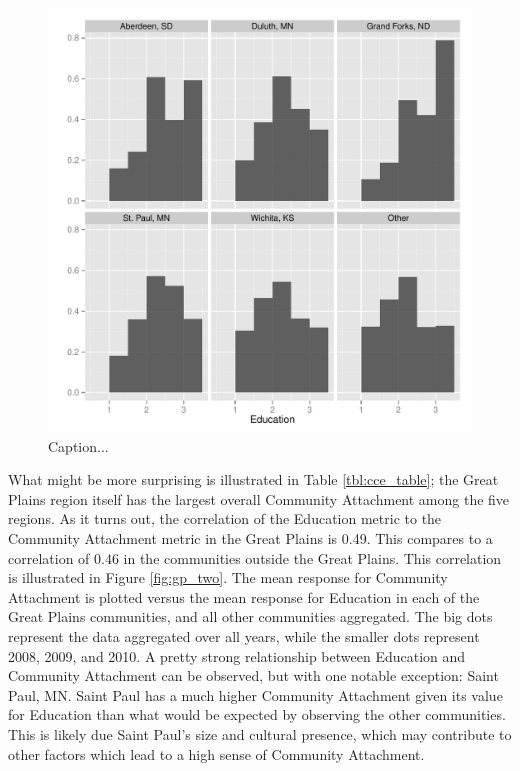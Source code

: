 \documentclass[11pt]{article}\usepackage{knitr}
\begin{document}
\begin{knitrout}
\color{fgcolor}\begin{figure}[H]

\includegraphics[width=\maxwidth]{figure/gp_one} \caption[Caption]{Caption...\label{fig:gp_one}}
\end{figure}


\end{knitrout}


What might be more surprising is illustrated in Table \ref{tbl:cce_table}; the Great Plains region itself has the largest overall Community Attachment among the five regions. As it turns out, the correlation of the Education metric to the Community Attachment metric in the Great Plains is 0.49. This compares to a correlation of 0.46 in the communities outside the Great Plains. This correlation is illustrated in Figure \ref{fig:gp_two}. The mean response for Community Attachment is plotted versus the mean response for Education in each of the Great Plains communities, and all other communities aggregated. The big dots represent the data aggregated over all years, while the smaller dots represent 2008, 2009, and 2010. A pretty strong relationship between Education and Community Attachment can be observed, but with one notable exception: Saint Paul, MN. Saint Paul has a much higher Community Attachment given its value for Education than what would be expected by observing the other communities. This is likely due Saint Paul's size and cultural presence, which may contribute to other factors which lead to a high sense of Community Attachment.
\end{document}
